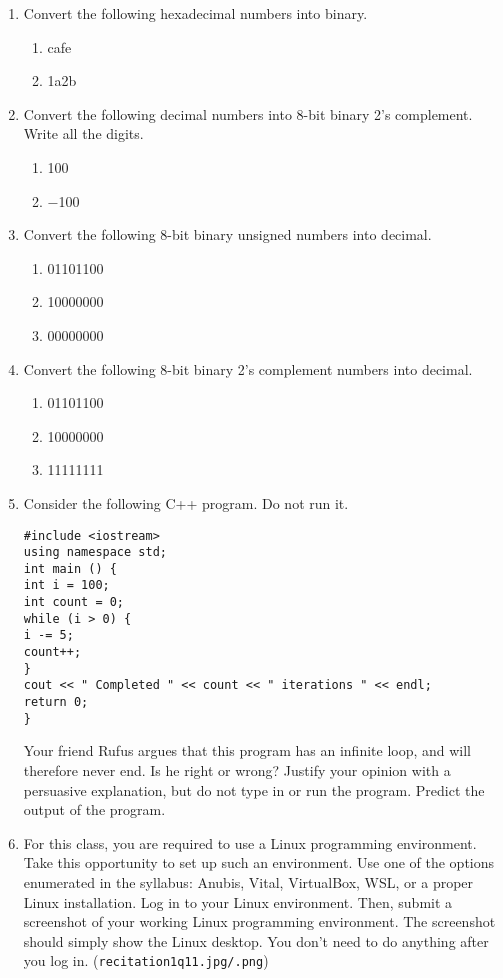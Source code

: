 \documentclass{article}
\begin{document}
\begin{enumerate}
    \item Convert the following hexadecimal numbers into binary.
    \begin{enumerate}
        \item cafe
        \item 1a2b
    \end{enumerate}

    \item Convert the following decimal numbers into 8-bit binary 2’s complement. Write all the digits.
    \begin{enumerate}
        \item 100
        \item −100
    \end{enumerate}
    \item Convert the following 8-bit binary unsigned numbers into decimal.
    \begin{enumerate}
        \item 01101100
        \item 10000000
        \item 00000000
    \end{enumerate}

    \item Convert the following 8-bit binary 2’s complement numbers into decimal.
    \begin{enumerate}
        \item 01101100
        \item 10000000
        \item 11111111
    \end{enumerate}

    \item Consider the following C++ program. Do not run it.
    \begin{verbatim}
#include <iostream>
using namespace std;
int main () {
int i = 100;
int count = 0;
while (i > 0) {
i -= 5;
count++;
}
cout << " Completed " << count << " iterations " << endl;
return 0;
}
    \end{verbatim}
    Your friend Rufus argues that this program has an infinite loop, and will therefore never end. Is he right or wrong? Justify your opinion with a persuasive explanation, but do not type in or run the program. Predict the output of the program.

    \item For this class, you are required to use a Linux programming environment. Take this opportunity to set up such an environment. Use one of the options enumerated in the syllabus: Anubis, Vital, VirtualBox, WSL, or a proper Linux installation. Log in to your Linux environment. Then, submit a screenshot of your working Linux programming environment. The screenshot should simply show the Linux desktop. You don’t need to do anything after you log in. (\texttt{recitation1q11.jpg/.png})


\end{enumerate}
\end{document}

